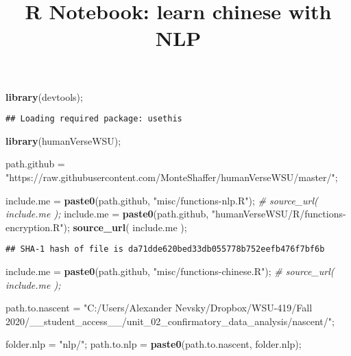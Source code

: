 \documentclass[
]{article}
\title{R Notebook: learn chinese with NLP}
\author{}
\date{\vspace{-2.5em}}
\newenvironment{Shaded}{\begin{snugshade}}{\end{snugshade}}
\newcommand{\CommentTok}[1]{\textcolor[rgb]{0.56,0.35,0.01}{\textit{#1}}}
\newcommand{\KeywordTok}[1]{\textcolor[rgb]{0.13,0.29,0.53}{\textbf{#1}}}
\newcommand{\NormalTok}[1]{#1}
\newcommand{\StringTok}[1]{\textcolor[rgb]{0.31,0.60,0.02}{#1}}
\begin{document}
\maketitle

{
\setcounter{tocdepth}{4}
\tableofcontents
}
\begin{Shaded}
\begin{Highlighting}[]
\KeywordTok{library}\NormalTok{(devtools);}
\end{Highlighting}
\end{Shaded}

\begin{verbatim}
## Loading required package: usethis
\end{verbatim}

\begin{Shaded}
\begin{Highlighting}[]
\KeywordTok{library}\NormalTok{(humanVerseWSU);}

\NormalTok{path.github =}\StringTok{ "https://raw.githubusercontent.com/MonteShaffer/humanVerseWSU/master/"}\NormalTok{;}

\NormalTok{include.me =}\StringTok{ }\KeywordTok{paste0}\NormalTok{(path.github, }\StringTok{"misc/functions{-}nlp.R"}\NormalTok{);}
\CommentTok{\# source\_url( include.me );}
\NormalTok{include.me =}\StringTok{ }\KeywordTok{paste0}\NormalTok{(path.github, }\StringTok{"humanVerseWSU/R/functions{-}encryption.R"}\NormalTok{);}
\KeywordTok{source\_url}\NormalTok{( include.me );}
\end{Highlighting}
\end{Shaded}

\begin{verbatim}
## SHA-1 hash of file is da71dde620bed33db055778b752eefb476f7bf6b
\end{verbatim}

\begin{Shaded}
\begin{Highlighting}[]
\NormalTok{include.me =}\StringTok{ }\KeywordTok{paste0}\NormalTok{(path.github, }\StringTok{"misc/functions{-}chinese.R"}\NormalTok{);}
\CommentTok{\# source\_url( include.me );}


\NormalTok{path.to.nascent =}\StringTok{ "C:/Users/Alexander Nevsky/Dropbox/WSU{-}419/Fall 2020/\_\_student\_access\_\_/unit\_02\_confirmatory\_data\_analysis/nascent/"}\NormalTok{;}

\NormalTok{folder.nlp =}\StringTok{ "nlp/"}\NormalTok{;}
\NormalTok{path.to.nlp =}\StringTok{ }\KeywordTok{paste0}\NormalTok{(path.to.nascent, folder.nlp);}
\end{Highlighting}
\end{Shaded}
\end{document}
